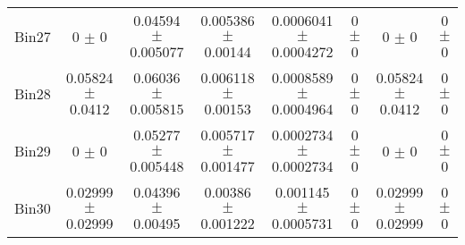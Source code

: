\begin{tabular}{@{\extracolsep{4pt}}lccccccc@{}}
     Bin27 & 0 $\pm$ 0 & 0.04594 $\pm$ 0.005077 & 0.005386 $\pm$ 0.00144 & 0.0006041 $\pm$ 0.0004272 & 0 $\pm$ 0 & 0 $\pm$ 0 & 0 $\pm$ 0 \\ 
     Bin28 & 0.05824 $\pm$ 0.0412 & 0.06036 $\pm$ 0.005815 & 0.006118 $\pm$ 0.00153 & 0.0008589 $\pm$ 0.0004964 & 0 $\pm$ 0 & 0.05824 $\pm$ 0.0412 & 0 $\pm$ 0 \\ 
     Bin29 & 0 $\pm$ 0 & 0.05277 $\pm$ 0.005448 & 0.005717 $\pm$ 0.001477 & 0.0002734 $\pm$ 0.0002734 & 0 $\pm$ 0 & 0 $\pm$ 0 & 0 $\pm$ 0 \\ 
     Bin30 & 0.02999 $\pm$ 0.02999 & 0.04396 $\pm$ 0.00495 & 0.00386 $\pm$ 0.001222 & 0.001145 $\pm$ 0.0005731 & 0 $\pm$ 0 & 0.02999 $\pm$ 0.02999 & 0 $\pm$ 0 \\ 
\hline\hline
  \end{tabular}
